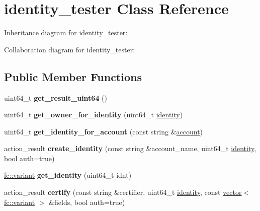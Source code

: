 \hypertarget{classidentity__tester}{}\section{identity\+\_\+tester Class Reference}
\label{classidentity__tester}


Inheritance diagram for identity\+\_\+tester\+:


Collaboration diagram for identity\+\_\+tester\+:
\subsection*{Public Member Functions}
\begin{DoxyCompactItemize}
\item 
\mbox{\label{classidentity__tester_a76bcecb7040fd8ee9bd855a64778f1f7}} 
uint64\+\_\+t {\bfseries get\+\_\+result\+\_\+uint64} ()
\item 
\mbox{\label{classidentity__tester_a04d0a914a2987e68d87441cb78662476}} 
uint64\+\_\+t {\bfseries get\+\_\+owner\+\_\+for\+\_\+identity} (uint64\+\_\+t \mbox{\hyperlink{structidentity}{identity}})
\item 
\mbox{\label{classidentity__tester_a5edf7541e82ced2a2a71e94d30c65a67}} 
uint64\+\_\+t {\bfseries get\+\_\+identity\+\_\+for\+\_\+account} (const string \&\mbox{\hyperlink{structaccount}{account}})
\item 
\mbox{\label{classidentity__tester_ad15c5b6660e53c2b49da9390fbbe0e50}} 
action\+\_\+result {\bfseries create\+\_\+identity} (const string \&account\+\_\+name, uint64\+\_\+t \mbox{\hyperlink{structidentity}{identity}}, bool auth=true)
\item 
\mbox{\label{classidentity__tester_acb62de240bba99a4d2d9e2dc5f62b0ad}} 
\mbox{\hyperlink{classfc_1_1variant}{fc\+::variant}} {\bfseries get\+\_\+identity} (uint64\+\_\+t idnt)
\item 
\mbox{\label{classidentity__tester_a0d5ceec7a34508a0fa60552397cdbf5e}} 
action\+\_\+result {\bfseries certify} (const string \&certifier, uint64\+\_\+t \mbox{\hyperlink{structidentity}{identity}}, const \mbox{\hyperlink{classstd_1_1vector}{vector}}$<$ \mbox{\hyperlink{classfc_1_1variant}{fc\+::variant}} $>$ \&fields, bool auth=true)

\end{DoxyCompactItemize}
